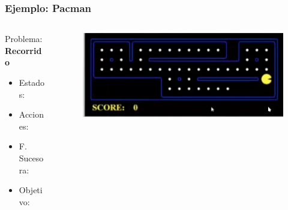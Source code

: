 \documentclass[10pt]{beamer}
\begin{document}
\begin{frame}
  \frametitle{Ejemplo: Pacman}

  \begin{columns}
    \begin{column}{0.5\textwidth}
      Problema: \textbf{Recorrido}
      \begin{itemize}
        \item Estados:
        \item Acciones:
        \item F. Sucesora:
        \item Objetivo:
      \end{itemize}
    \end{column}
    
    \begin{column}{0.5\textwidth}
      \begin{figure}[!h] 
        \centering
        \includegraphics[width=\textwidth]{img/pacman2}
      \end{figure} 
    \end{column}
  \end{columns}

\end{frame}
\end{document}
